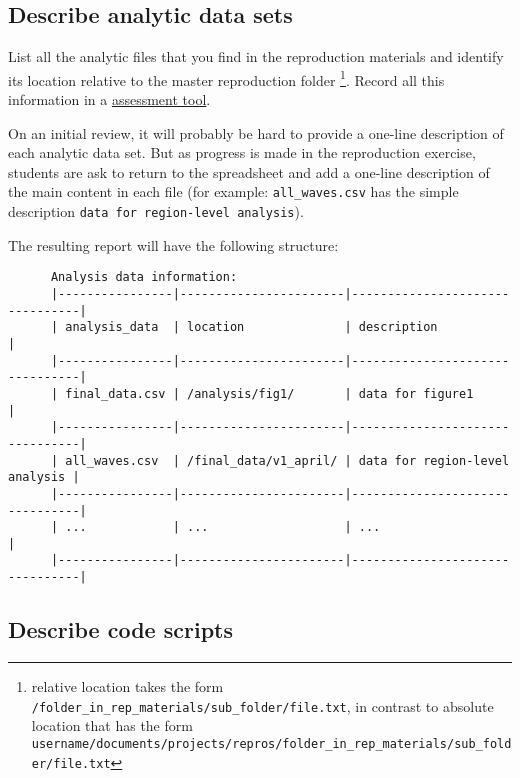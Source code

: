 \documentclass[]{book}
\begin{document}
\hypertarget{describe-analytic-data-sets}{%
\subsection{Describe analytic data sets}\label{describe-analytic-data-sets}}

List all the analytic files that you find in the reproduction materials and identify its location relative to the master reproduction folder \footnote{relative location takes the form \texttt{/folder\_in\_rep\_materials/sub\_folder/file.txt}, in contrast to absolute location that has the form \texttt{username/documents/projects/repros/folder\_in\_rep\_materials/sub\_folder/file.txt}}. Record all this information in a \href{https://docs.google.com/spreadsheets/d/1LUIdVFH0OfR70C7z07TYeE-uWzKI_JIeWUMaYhqEKK0/edit\#gid=1299317837\&range=A1}{assessment tool}.

On an initial review, it will probably be hard to provide a one-line description of each analytic data set. But as progress is made in the reproduction exercise, students are ask to return to the spreadsheet and add a one-line description of the main content in each file (for example: \texttt{all\_waves.csv} has the simple description \texttt{data\ for\ region-level\ analysis}).

The resulting report will have the following structure:

\begin{verbatim}
      Analysis data information:
      |----------------|-----------------------|--------------------------------|
      | analysis_data  | location              | description                    |
      |----------------|-----------------------|--------------------------------|
      | final_data.csv | /analysis/fig1/       | data for figure1               |
      |----------------|-----------------------|--------------------------------|
      | all_waves.csv  | /final_data/v1_april/ | data for region-level analysis |
      |----------------|-----------------------|--------------------------------|
      | ...            | ...                   | ...                            |
      |----------------|-----------------------|--------------------------------|
\end{verbatim}

\hypertarget{describe-code-scripts}{%
\subsection{Describe code scripts}\label{describe-code-scripts}}
\end{document}

